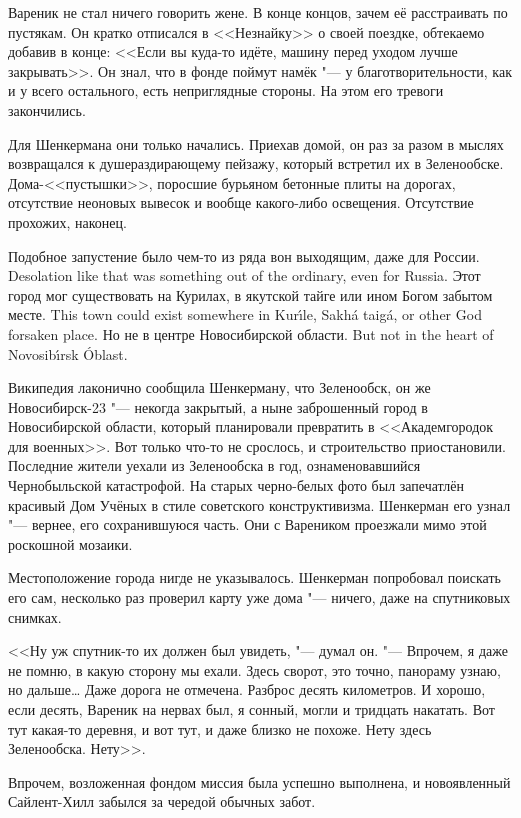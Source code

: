 Вареник не стал ничего говорить жене.
В конце концов, зачем её расстраивать по пустякам.
Он кратко отписался в <<Незнайку>> о своей поездке, обтекаемо добавив в конце:
<<Если вы куда-то идёте, машину перед уходом лучше закрывать>>.
Он знал, что в фонде поймут намёк "--- у благотворительности, как и у всего остального, есть неприглядные стороны.
На этом его тревоги закончились.

Для Шенкермана они только начались.
Приехав домой, он раз за разом в мыслях возвращался к душераздирающему пейзажу, который встретил их в Зеленообске.
Дома-<<пустышки>>, поросшие бурьяном бетонные плиты на дорогах, отсутствие неоновых вывесок и вообще какого-либо освещения.
Отсутствие прохожих, наконец.

{Подобное запустение было чем-то из ряда вон выходящим, даже для России.}
{Desolation like that was something out of the ordinary, even for Russia.}
{Этот город мог существовать на Курилах, в якутской тайге или ином Богом забытом месте.}
{This town could exist somewhere in Kur\'{\i}le, Sakh\'a taig\'a, or other God forsaken place.}
{Но не в центре Новосибирской области.}
{But not in the heart of Novosib\'{\i}rsk \'Oblast.}

Википедия лаконично сообщила Шенкерману, что Зеленообск, он же Новосибирск-23 "--- некогда закрытый, а ныне заброшенный город в Новосибирской области, который планировали превратить в <<Академгородок для военных>>.
Вот только что-то не срослось, и строительство приостановили.
Последние жители уехали из Зеленообска в год, ознаменовавшийся Чернобыльской катастрофой.
На старых черно-белых фото был запечатлён красивый Дом Учёных в стиле советского конструктивизма.
Шенкерман его узнал "--- вернее, его сохранившуюся часть.
Они с Вареником проезжали мимо этой роскошной мозаики.

Местоположение города нигде не указывалось.
Шенкерман попробовал поискать его сам, несколько раз проверил карту уже дома "--- ничего, даже на спутниковых снимках.

<<Ну уж спутник-то их должен был увидеть, "--- думал он.
"--- Впрочем, я даже не помню, в какую сторону мы ехали.
Здесь сворот, это точно, панораму узнаю, но дальше\ldots{}
Даже дорога не отмечена.
Разброс десять километров.
И хорошо, если десять, Вареник на нервах был, я сонный, могли и тридцать накатать.
Вот тут какая-то деревня, и вот тут, и даже близко не похоже.
Нету здесь Зеленообска.
Нету>>.

Впрочем, возложенная фондом миссия была успешно выполнена, и новоявленный Сайлент-Хилл забылся за чередой обычных забот.

